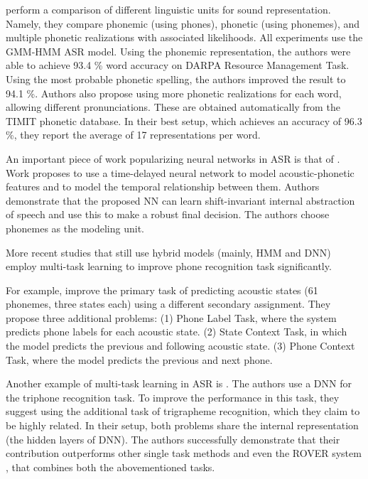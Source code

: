  perform a comparison of different linguistic units for sound representation. Namely, they compare phonemic (using phones), phonetic (using phonemes), and multiple phonetic realizations with associated likelihoods. All experiments use the GMM-HMM ASR model. Using the phonemic representation, the authors were able to achieve 93.4 \% word accuracy on DARPA Resource Management Task. Using the most probable phonetic spelling, the authors improved the result to 94.1 \%. Authors also propose using more phonetic realizations for each word, allowing different pronunciations. These are obtained automatically from the TIMIT phonetic database. In their best setup, which achieves an accuracy of 96.3 \%, they report the average of 17 representations per word.

An important piece of work popularizing neural networks in ASR is that of . Work proposes to use a time-delayed neural network to model acoustic-phonetic features and to model the temporal relationship between them. Authors demonstrate that the proposed NN can learn shift-invariant internal abstraction of speech and use this to make a robust final decision. The authors choose phonemes as the modeling unit.

More recent studies that still use hybrid models (mainly, HMM and DNN) employ multi-task learning to improve phone recognition task significantly. 

For example,  improve the primary task of predicting acoustic states (61 phonemes, three states each) using a different secondary assignment. They propose three additional problems: (1) Phone Label Task, where the system predicts phone labels for each acoustic state. (2) State Context Task, in which the model predicts the previous and following acoustic state. (3) Phone Context Task, where the model predicts the previous and next phone.

Another example of multi-task learning in ASR is . The authors use a DNN for the triphone recognition task. To improve the performance in this task, they suggest using the additional task of trigrapheme recognition, which they claim to be highly related. In their setup, both problems share the internal representation (the hidden layers of DNN). The authors successfully demonstrate that their contribution outperforms other single task methods and even the ROVER system , that combines both the abovementioned tasks.

